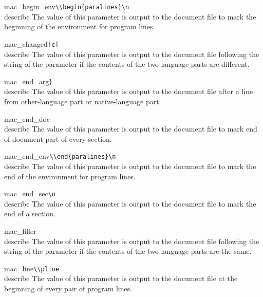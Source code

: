 \begin{describepara}{mac_begin_env}{\verb*|\\begin{paralines}\n|}\\describe
The value of this parameter is output to the document file to
mark the beginning of the environment for program lines.
\end{describepara}
\begin{describepara}{mac_changed}{\verb*|[c]|}\\describe
The value of this parameter is output to the document file following
the string of the parameter  if the contents of the two
language parts are different.
\end{describepara}
\begin{describepara}{mac_end_arg}{\verb*|}|}\\describe
The value of this parameter is output to the document file after a line
from other-language part or native-language part.
\end{describepara}
\begin{describepara}{mac_end_doc}{\verb*||}\\describe
The value of this parameter is output to the document file to mark
end of document part of every section.
\end{describepara}
\begin{describepara}{mac_end_env}{\verb*|\\end{paralines}\n|}\\describe
The value of this parameter is output to the document file to
mark the end of the environment for program lines.
\end{describepara}
\begin{describepara}{mac_end_sec}{\verb*|\n|}\\describe
The value of this parameter is output to the document file to
mark the end of a section.
\end{describepara}
\begin{describepara}{mac_filler}{\verb*||}\\describe
The value of this parameter is output to the document file following
the string of the parameter  if the contents of the two
language parts are the same.
\end{describepara}
\begin{describepara}{mac_line}{\verb*|\\pline|}\\describe
The value of this parameter is output to the document file at the
beginning of every pair of program lines.
\end{describepara}
